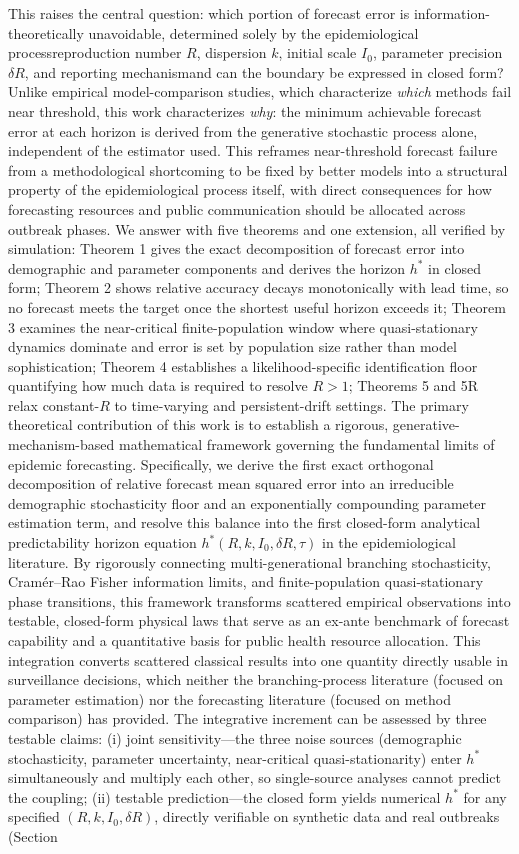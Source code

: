 \documentclass[review]{elsarticle}
\theoremstyle{plain}
\theoremstyle{definition}
\begin{document}
This raises the central question: which portion of forecast error is information-theoretically unavoidable, determined solely by the epidemiological process\textemdash reproduction number $R$, dispersion $k$, initial scale $I_0$, parameter precision $\delta R$, and reporting mechanism\textemdash and can the boundary be expressed in closed form? Unlike empirical model-comparison studies, which characterize \emph{which} methods fail near threshold, this work characterizes \emph{why}: the minimum achievable forecast error at each horizon is derived from the generative stochastic process alone, independent of the estimator used. This reframes near-threshold forecast failure from a methodological shortcoming to be fixed by better models into a structural property of the epidemiological process itself, with direct consequences for how forecasting resources and public communication should be allocated across outbreak phases. We answer with five theorems and one extension, all verified by simulation: Theorem 1 gives the exact decomposition of forecast error into demographic and parameter components and derives the horizon $h^*$ in closed form; Theorem 2 shows relative accuracy decays monotonically with lead time, so no forecast meets the target once the shortest useful horizon exceeds it; Theorem 3 examines the near-critical finite-population window where quasi-stationary dynamics dominate and error is set by population size rather than model sophistication; Theorem 4 establishes a likelihood-specific identification floor quantifying how much data is required to resolve $R>1$; Theorems 5 and 5R relax constant-$R$ to time-varying and persistent-drift settings. The primary theoretical contribution of this work is to establish a rigorous, generative-mechanism-based mathematical framework governing the fundamental limits of epidemic forecasting. Specifically, we derive the first exact orthogonal decomposition of relative forecast mean squared error into an irreducible demographic stochasticity floor and an exponentially compounding parameter estimation term, and resolve this balance into the first closed-form analytical predictability horizon equation $h^*(R, k, I_0, \delta R, \tau)$ in the epidemiological literature. By rigorously connecting multi-generational branching stochasticity, Cram\'er--Rao Fisher information limits, and finite-population quasi-stationary phase transitions, this framework transforms scattered empirical observations into testable, closed-form physical laws that serve as an ex-ante benchmark of forecast capability and a quantitative basis for public health resource allocation. This integration converts scattered classical results into one quantity directly usable in surveillance decisions, which neither the branching-process literature (focused on parameter estimation) nor the forecasting literature (focused on method comparison) has provided. The integrative increment can be assessed by three testable claims: (i) joint sensitivity---the three noise sources (demographic stochasticity, parameter uncertainty, near-critical quasi-stationarity) enter $h^*$ simultaneously and multiply each other, so single-source analyses cannot predict the coupling; (ii) testable prediction---the closed form yields numerical $h^*$ for any specified $(R, k, I_0, \delta R)$, directly verifiable on synthetic data and real outbreaks (Section~
\end{document}
